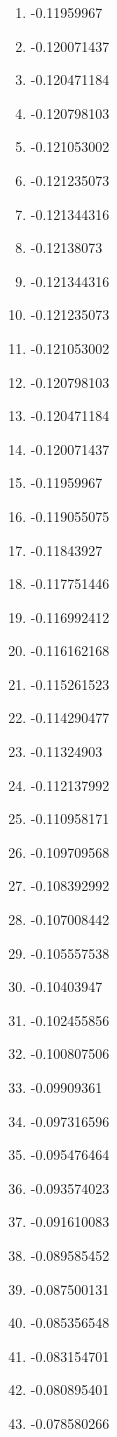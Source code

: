 \documentclass[6pt]{article}
\begin{document}
\begin{multicols}{4}
\begin{enumerate}
		\item -0.11959967
		\item -0.120071437
		\item -0.120471184
		\item -0.120798103
		\item -0.121053002
		\item -0.121235073
		\item -0.121344316
		\item -0.12138073
		\item -0.121344316
		\item -0.121235073
		\item -0.121053002
		\item -0.120798103
		\item -0.120471184
		\item -0.120071437
		\item -0.11959967
		\item -0.119055075
		\item -0.11843927
		\item -0.117751446
		\item -0.116992412
		\item -0.116162168
		\item -0.115261523
		\item -0.114290477
		\item -0.11324903
		\item -0.112137992
		\item -0.110958171
		\item -0.109709568
		\item -0.108392992
		\item -0.107008442
		\item -0.105557538
		\item -0.10403947
		\item -0.102455856
		\item -0.100807506
		\item -0.09909361
		\item -0.097316596
		\item -0.095476464
		\item -0.093574023
		\item -0.091610083
		\item -0.089585452
		\item -0.087500131
		\item -0.085356548
		\item -0.083154701
		\item -0.080895401
		\item -0.078580266

\end{enumerate}
\end{multicols}
\end{document}
